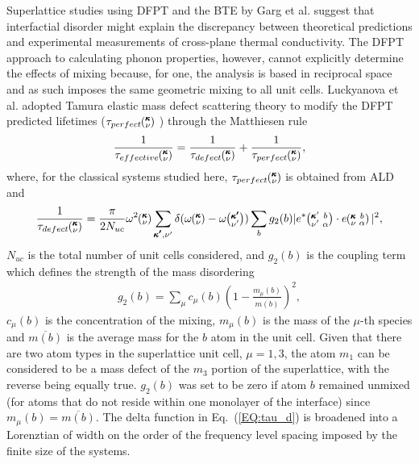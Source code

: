 \documentclass[aps,prb,preprint,preprintnumbers,amsmath,amssymb,floatfix,superscriptaddress]{revtex4}
\newcommand{\kvba}{\mspace{-4.0mu}\left(\mspace{-8.0mu}
\begin{smallmatrix} &\pmb{\kappa} &b \\ &\nu &\alpha\end{smallmatrix}
\mspace{-3.0mu}\right)}
\newcommand{\kvbap}{\mspace{-4.0mu}\left(\mspace{-8.0mu}
\begin{smallmatrix} &\pmb{\kappa}' &b \\ &\nu' &\alpha\end{smallmatrix}
\mspace{-3.0mu}\right)}
\newcommand{\kv}{\mspace{-4.0mu}\left(\mspace{-8.0mu}
\begin{smallmatrix}&\pmb{\kappa} \\&\nu\end{smallmatrix}
\mspace{-3.0mu}\right)}
\newcommand{\kvp}{\mspace{-4.0mu}\left(\mspace{-8.0mu}
\begin{smallmatrix}&\pmb{\kappa'} \\&\nu'\end{smallmatrix}
\mspace{-3.0mu}\right)}
\begin{document}
Superlattice studies using DFPT and the BTE by Garg et al. suggest that interfactial disorder might explain the discrepancy between theoretical predictions and experimental measurements of cross-plane thermal conductivity. \cite{doi:10.1021/nl202186y}  The DFPT approach to calculating phonon properties, however, cannot explicitly determine the effects of mixing because, for one, the analysis is based in reciprocal space and as such imposes the same geometric mixing to all unit cells. Luckyanova et al. \cite{Luckyanova16112012} adopted Tamura elastic mass defect scattering theory \cite{tamura_isotope_1983} to modify the DFPT predicted lifetimes  ($\tau_{perfect}\kv$ ) through the Matthiesen rule
\begin{equation}\label{EQ:tau_eff}
\begin{split}
\frac{1}{\tau_{effective}\kv} = \frac{1}{\tau_{defect}\kv}+\frac{1}{\tau_{perfect}\kv} ,
\end{split}
\end{equation}
where, for the classical systems studied here, $\tau_{perfect}\kv$ is obtained from ALD and
\begin{equation}\label{EQ:tau_d}
\begin{split}
\frac{1}{\tau_{defect}\kv} = \frac{\pi}{2N_{uc}}\omega^2\kv 
\sum_{\pmb{\kappa'},\nu'} \delta( \omega\kv - \omega\kvp )\sum_{b} g_2(b) 
|e^*\kvbap \cdot e\kvba |^2 ,
\end{split}
\end{equation}
$N_{uc}$ is the total number of unit cells considered, and $g_2(b)$ is the coupling term which defines the strength of the mass disordering
\begin{equation}\label{EQ:g(b)}
\begin{split}
g_2(b) = \sum_\mu c_{\mu}(b)\left(1-\frac{m_{\mu}(b)}{\overline{m(b)}}\right)^2, 
\end{split}
\end{equation}
$c_\mu(b)$ is the concentration of the mixing, $m_\mu(b)$ is the mass of the $\mu$-th species and $\overline{m(b)}$ is the average mass for the $b$ atom in the unit cell. Given that there are two atom types in the superlattice unit cell, $\mu=1,3$, the atom $m_1$ can be considered to be a mass defect of the $m_3$ portion of the superlattice, with the reverse being equally true. $g_2(b)$ was set to be zero if atom $b$ remained unmixed (for atoms that do not reside within one monolayer of the interface) since $m_{\mu}(b)=\overline{m(b)}$. The delta function in Eq.~(\ref{EQ:tau_d}) is broadened into a Lorenztian of width on the order of the frequency level spacing imposed by the finite size of the systems.\cite{allen_thermal_1993}
\end{document}
